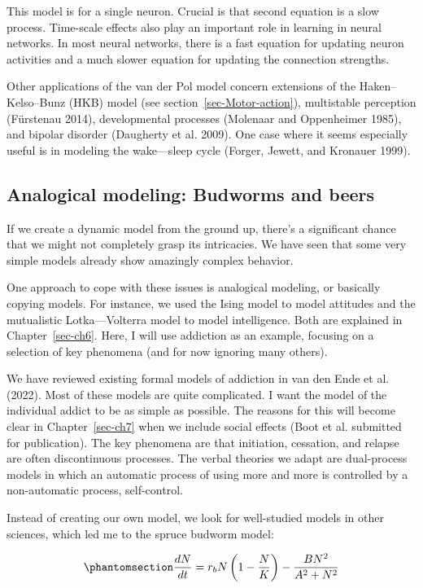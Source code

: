 \documentclass[
  a4paper,
  DIV=11,
  numbers=noendperiod,
  oneside]{scrreprt}
\begin{document}
This model is for a single neuron. Crucial is that second equation is a
slow process. Time-scale effects also play an important role in learning
in neural networks. In most neural networks, there is a fast equation
for updating neuron activities and a much slower equation for updating
the connection strengths.

Other applications of the van der Pol model concern extensions of the
Haken--Kelso--Bunz (HKB) model (see section~\ref{sec-Motor-action}),
multistable perception (Fürstenau 2014), developmental processes
(Molenaar and Oppenheimer 1985), and bipolar disorder (Daugherty et al.
2009). One case where it seems especially useful is in modeling the
wake---sleep cycle (Forger, Jewett, and Kronauer 1999).

\subsection{Analogical modeling: Budworms and
beers}\label{sec-Analogical-modeling-Budworms-and-Beers}

If we create a dynamic model from the ground up, there's a significant
chance that we might not completely grasp its intricacies. We have seen
that some very simple models already show amazingly complex behavior.

One approach to cope with these issues is analogical modeling, or
basically copying models. For instance, we used the Ising model to model
attitudes and the mutualistic Lotka---Volterra model to model
intelligence. Both are explained in Chapter~\ref{sec-ch6}. Here, I will
use addiction as an example, focusing on a selection of key phenomena
(and for now ignoring many others).

We have reviewed existing formal models of addiction in van den Ende et
al. (2022). Most of these models are quite complicated. I want the model
of the individual addict to be as simple as possible. The reasons for
this will become clear in Chapter~\ref{sec-ch7} when we include social
effects (Boot et al. submitted for publication). The key phenomena are
that initiation, cessation, and relapse are often discontinuous
processes. The verbal theories we adapt are dual-process models in which
an automatic process of using more and more is controlled by a
non-automatic process, self-control.

Instead of creating our own model, we look for well-studied models in
other sciences, which led me to the spruce budworm model:

\begin{equation}\phantomsection\label{eq-ch4n-17-old-37}{
\frac{dN}{dt} = r_{b}N\left( 1 - \frac{N}{K} \right) - \frac{BN^{2}}{A^{2} + N^{2}}
}\end{equation}
\end{document}
